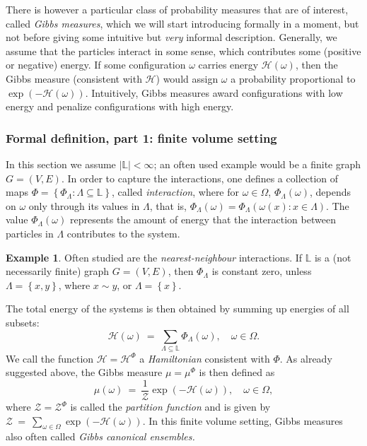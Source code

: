 \documentclass[12pt]{article}
\renewcommand{\H}{\mathcal{H}}
\renewcommand{\L}{\mathbb{L}}
\newcommand{\ZZ}{\mathcal{Z}}
\newcommand{\set}[1]{\left\{#1\right\}}
\newcommand{\1}{\mathbbm{1}}
\newcommand{\5}{\vspace{0.5cm}}
\theoremstyle{definition}
\newtheorem{ex}[thm]{Example}
\begin{document}
There is however a particular class of probability measures that are of interest, called \textit{Gibbs measures}, which we will start introducing formally in a moment, but not before giving some intuitive but \textit{very} informal description. Generally, we assume that the particles interact in some sense, which contributes some (positive or negative) energy. If some configuration $\omega$ carries energy $\H(\omega)$, then the Gibbs measure (consistent with $\H$) would assign $\omega$ a probability proportional to $\exp(-\H(\omega))$. Intuitively, Gibbs measures award configurations with low energy and penalize configurations with high energy. 


\subsubsection{Formal definition, part 1: finite volume setting}

In this section we assume $|\L|<\infty$; an often used example would be a finite graph $G=(V,E)$. In order to capture the interactions, one defines a collection of maps $\Phi=\set{\Phi_\Lambda:\Lambda\subseteq\L}$, called \textit{interaction}, where for $\omega\in\Omega$, $\Phi_\Lambda(\omega)$, depends on $\omega$ only through its values in $\Lambda$, that is, $\Phi_\Lambda(\omega)=\Phi_\Lambda(\omega(x)\!:\!x\in\Lambda)$. The value $\Phi_\Lambda(\omega)$ represents the amount of energy that the interaction between particles in $\Lambda$ contributes to the system.

\begin{ex}
Often studied are the \textit{nearest-neighbour} interactions. If $\L$ is a (not necessarily finite) graph $G=(V,E)$, then $\Phi_\Lambda$ is constant zero, unless $\Lambda=\set{x,y}$, where $x\sim y$, or $\Lambda=\set{x}$.
\end{ex}

The total energy of the systems is then obtained by summing up energies of all subsets:
$$\H(\omega) ~=~ \sum_{\Lambda\subseteq \L}\Phi_\Lambda(\omega), \quad \omega\in\Omega.$$
We call the function $\H=\H^\Phi$ a \textit{Hamiltonian} consistent with $\Phi$. As already suggested above, the Gibbs measure $\mu=\mu^\Phi$ is then defined as
$$\mu(\omega) ~=~ \frac{1}{\ZZ}\exp(-\H(\omega)), \quad \omega\in\Omega,$$
where $\ZZ=\ZZ^\Phi$ is called the \textit{partition function} and is given by $\ZZ ~=~ \sum_{\omega\in\Omega}\exp(-\H(\omega)).$ In this finite volume setting, Gibbs measures also often called \textit{Gibbs canonical ensembles.} \\
\end{document}
